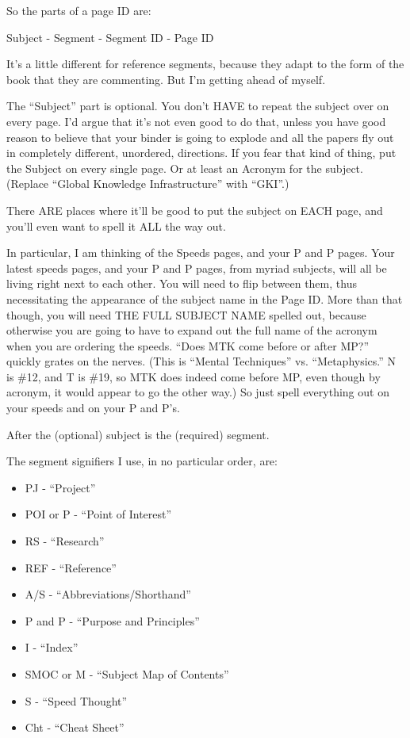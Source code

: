 \documentclass[oneside]{book}
\begin{document}
So the parts of a page ID are:

  Subject - Segment - Segment ID - Page ID

It's a little different for reference segments, because they adapt to
the form of the book that they are commenting. But I'm getting ahead
of myself.

The ``Subject'' part is optional. You don't HAVE to repeat the subject
over on every page. I'd argue that it's not even good to do that,
unless you have good reason to believe that your binder is going to
explode and all the papers fly out in completely different, unordered,
directions. If you fear that kind of thing, put the Subject on every
single page. Or at least an Acronym for the subject. (Replace ``Global
Knowledge Infrastructure'' with ``GKI''.)

There ARE places where it'll be good to put the subject on EACH page,
and you'll even want to spell it ALL the way out.

In particular, I am thinking of the Speeds pages, and your P and P
pages. Your latest speeds pages, and your P and P pages, from myriad
subjects, will all be living right next to each other. You will need
to flip between them, thus necessitating the appearance of the subject
name in the Page ID. More than that though, you will need THE FULL
SUBJECT NAME spelled out, because otherwise you are going to have to
expand out the full name of the acronym when you are ordering the
speeds. ``Does MTK come before or after MP?'' quickly grates on the
nerves. (This is ``Mental Techniques'' vs. ``Metaphysics.'' N is \#12, and
T is \#19, so MTK does indeed come before MP, even though by acronym,
it would appear to go the other way.) So just spell everything out on
your speeds and on your P and P's.

After the (optional) subject is the (required) segment.

The segment signifiers I use, in no particular order, are:

\begin{itemize}
\item PJ         - ``Project''
\item POI or P   - ``Point of Interest''
\item RS         - ``Research''
\item REF        - ``Reference''
\item A/S        - ``Abbreviations/Shorthand''
\item P and P        - ``Purpose and Principles''
\item I          - ``Index''
\item SMOC or M  - ``Subject Map of Contents''
\item S          - ``Speed Thought''
\item Cht        - ``Cheat Sheet''
\end{itemize}
\end{document}

